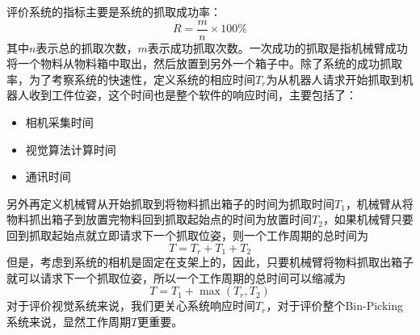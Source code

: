 评价系统的指标主要是系统的抓取成功率：
\begin{equation}
  R = \frac{m}{n}\times 100\%
\end{equation}
其中$n$表示总的抓取次数，$m$表示成功抓取次数。一次成功的抓取是指机械臂成功将一个物料从物料箱中取出，然后放置到另外一个箱子中。除了系统的成功抓取率，为了考察系统的快速性，定义系统的相应时间$T_r$为从机器人请求开始抓取到机器人收到工件位姿，这个时间也是整个软件的响应时间，主要包括了：
\begin{itemize}
\item 相机采集时间
\item 视觉算法计算时间
\item 通讯时间
\end{itemize}
另外再定义机械臂从开始抓取到将物料抓出箱子的时间为抓取时间$T_1$，机械臂从将物料抓出箱子到放置完物料回到抓取起始点的时间为放置时间$T_2$，如果机械臂只要回到抓取起始点就立即请求下一个抓取位姿，则一个工作周期的总时间为
\begin{equation}
  T = T_r + T_1 + T_2
\end{equation}
但是，考虑到系统的相机是固定在支架上的，因此，只要机械臂将物料抓取出箱子就可以请求下一个抓取位姿，所以一个工作周期的总时间可以缩减为
\begin{equation}
  T = T_1 + \max(T_r,T_2)
\end{equation}
对于评价视觉系统来说，我们更关心系统响应时间$T_r$，对于评价整个Bin-Picking系统来说，显然工作周期$T$更重要。
